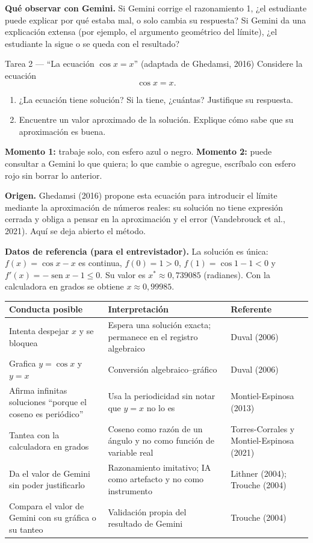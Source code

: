 \documentclass[11pt,letterpaper]{article}
\DeclareMathOperator{\seno}{sen}
\begin{document}
\noindent\textbf{Qué observar con Gemini.} Si Gemini corrige el razonamiento 1, ¿el estudiante puede explicar por qué estaba mal, o solo cambia su respuesta? Si Gemini da una explicación extensa (por ejemplo, el argumento geométrico del límite), ¿el estudiante la sigue o se queda con el resultado?

\bigskip
\begin{tarea}{Tarea 2 --- ``La ecuación $\cos x = x$'' (adaptada de Ghedamsi, 2016)}
Considere la ecuación
\[
\cos x = x .
\]
\begin{enumerate}[label=\alph*)]
  \item ¿La ecuación tiene solución? Si la tiene, ¿cuántas? Justifique su respuesta.
  \item Encuentre un valor aproximado de la solución. Explique cómo sabe que su aproximación es buena.
\end{enumerate}
\small\textbf{Momento 1:} trabaje solo, con esfero azul o negro. \textbf{Momento 2:} puede consultar a Gemini lo que quiera; lo que cambie o agregue, escríbalo con esfero rojo sin borrar lo anterior.
\end{tarea}

\noindent\textbf{Origen.} Ghedamsi (2016) propone esta ecuación para introducir el límite mediante la aproximación de números reales: su solución no tiene expresión cerrada y obliga a pensar en la aproximación y el error (Vandebrouck et al., 2021). Aquí se deja abierto el método.

\noindent\textbf{Datos de referencia (para el entrevistador).} La solución es única: $f(x)=\cos x - x$ es continua, $f(0)=1>0$, $f(1)=\cos 1 - 1<0$ y $f'(x)=-\seno x-1\le 0$. Su valor es $x^*\approx 0{,}739085$ (radianes). Con la calculadora en grados se obtiene $x\approx 0{,}99985$.

\begin{center}
\small
\renewcommand{\arraystretch}{1.25}
\begin{tabularx}{\linewidth}{@{}p{4.4cm}Lp{2.8cm}@{}}
\toprule
\textbf{Conducta posible} & \textbf{Interpretación} & \textbf{Referente}\\
\midrule
Intenta despejar $x$ y se bloquea & Espera una solución exacta; permanece en el registro algebraico & Duval (2006)\\
Grafica $y=\cos x$ y $y=x$ & Conversión algebraico--gráfico & Duval (2006)\\
Afirma infinitas soluciones ``porque el coseno es periódico'' & Usa la periodicidad sin notar que $y=x$ no lo es & Montiel-Espinosa (2013)\\
Tantea con la calculadora en grados & Coseno como razón de un ángulo y no como función de variable real & Torres-Corrales y Montiel-Espinosa (2021)\\
Da el valor de Gemini sin poder justificarlo & Razonamiento imitativo; IA como artefacto y no como instrumento & Lithner (2004); Trouche (2004)\\
Compara el valor de Gemini con su gráfica o su tanteo & Validación propia del resultado de Gemini & Trouche (2004)\\
\bottomrule
\end{tabularx}
\end{center}
\end{document}
